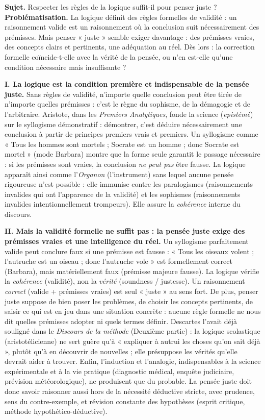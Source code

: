 \documentclass[11pt]{article}
\begin{document}
\begin{exoresolu}
\textbf{Sujet.} Respecter les règles de la logique suffit-il pour penser juste ?
\tcblower
\textbf{Problématisation.} La logique définit des règles formelles de validité : un raisonnement valide est un raisonnement où la conclusion suit nécessairement des prémisses. Mais penser « juste » semble exiger davantage : des prémisses vraies, des concepts clairs et pertinents, une adéquation au réel. Dès lors : la correction formelle coïncide-t-elle avec la vérité de la pensée, ou n'en est-elle qu'une condition nécessaire mais insuffisante ?

\textbf{I. La logique est la condition première et indispensable de la pensée juste.}
Sans règles de validité, n'importe quelle conclusion peut être tirée de n'importe quelles prémisses : c'est le règne du sophisme, de la démagogie et de l'arbitraire. Aristote, dans les \emph{Premiers Analytiques}, fonde la science (\emph{epistémè}) sur le syllogisme démonstratif : démontrer, c'est déduire nécessairement une conclusion à partir de principes premiers vrais et premiers. Un syllogisme comme « Tous les hommes sont mortels ; Socrate est un homme ; donc Socrate est mortel » (mode Barbara) montre que la forme seule garantit le passage nécessaire : si les prémisses sont vraies, la conclusion \emph{ne peut pas} être fausse. La logique apparaît ainsi comme l'\emph{Organon} (l'instrument) sans lequel aucune pensée rigoureuse n'est possible : elle immunise contre les paralogismes (raisonnements invalides qui ont l'apparence de la validité) et les sophismes (raisonnements invalides intentionnellement trompeurs). Elle assure la \emph{cohérence} interne du discours.

\textbf{II. Mais la validité formelle ne suffit pas : la pensée juste exige des prémisses vraies et une intelligence du réel.}
Un syllogisme parfaitement valide peut conclure faux si une prémisse est fausse : « Tous les oiseaux volent ; l'autruche est un oiseau ; donc l'autruche vole » est formellement correct (Barbara), mais matériellement faux (prémisse majeure fausse). La logique vérifie la \emph{cohérence} (validité), non la \emph{vérité} (soundness / justesse). Un raisonnement \emph{correct} (valide + prémisses vraies) est seul « juste » au sens fort.
De plus, penser juste suppose de bien poser les problèmes, de choisir les concepts pertinents, de saisir ce qui est en jeu dans une situation concrète : aucune règle formelle ne nous dit quelles prémisses adopter ni quels termes définir. Descartes l'avait déjà souligné dans le \emph{Discours de la méthode} (Deuxième partie) : la logique scolastique (aristotélicienne) ne sert guère qu'à « expliquer à autrui les choses qu'on sait déjà », plutôt qu'à en découvrir de nouvelles ; elle présuppose les vérités qu'elle devrait aider à trouver.
Enfin, l'induction et l'analogie, indispensables à la science expérimentale et à la vie pratique (diagnostic médical, enquête judiciaire, prévision météorologique), ne produisent que du probable. La pensée juste doit donc savoir raisonner aussi hors de la nécessité déductive stricte, avec prudence, sens du contre-exemple, et révision constante des hypothèses (esprit critique, méthode hypothético-déductive).


\end{exoresolu}
\end{document}
